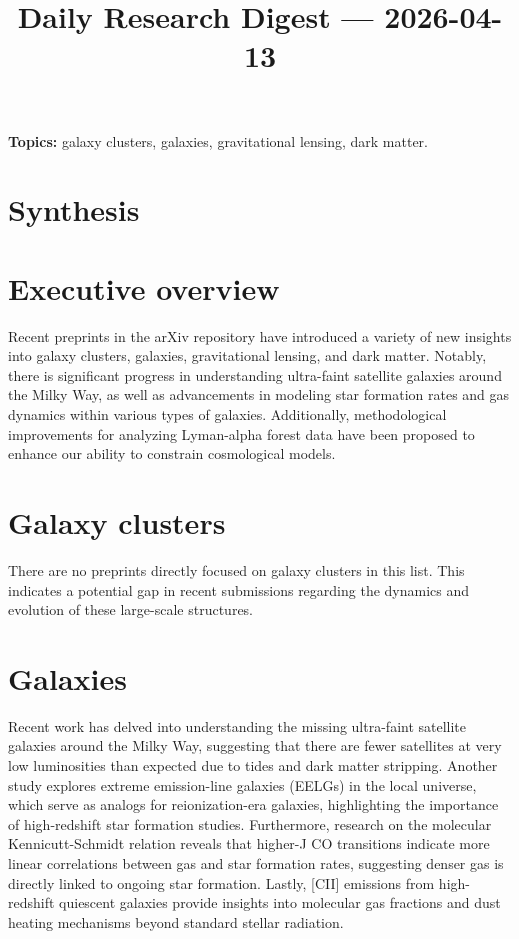 \documentclass[11pt]{article}
\begin{document}
\title{Daily Research Digest --- 2026-04-13}
\author{}
\date{}
\maketitle
\textbf{Topics:} galaxy clusters, galaxies, gravitational lensing, dark matter.
\section*{Synthesis}
\section*{Executive overview}
Recent preprints in the arXiv repository have introduced a variety of new insights into galaxy clusters, galaxies, gravitational lensing, and dark matter. Notably, there is significant progress in understanding ultra-faint satellite galaxies around the Milky Way, as well as advancements in modeling star formation rates and gas dynamics within various types of galaxies. Additionally, methodological improvements for analyzing Lyman-alpha forest data have been proposed to enhance our ability to constrain cosmological models.
\section*{Galaxy clusters}
There are no preprints directly focused on galaxy clusters in this list. This indicates a potential gap in recent submissions regarding the dynamics and evolution of these large-scale structures.
\section*{Galaxies}
Recent work has delved into understanding the missing ultra-faint satellite galaxies around the Milky Way, suggesting that there are fewer satellites at very low luminosities than expected due to tides and dark matter stripping. Another study explores extreme emission-line galaxies (EELGs) in the local universe, which serve as analogs for reionization-era galaxies, highlighting the importance of high-redshift star formation studies. Furthermore, research on the molecular Kennicutt-Schmidt relation reveals that higher-J CO transitions indicate more linear correlations between gas and star formation rates, suggesting denser gas is directly linked to ongoing star formation. Lastly, [CII] emissions from high-redshift quiescent galaxies provide insights into molecular gas fractions and dust heating mechanisms beyond standard stellar radiation.
\end{document}
